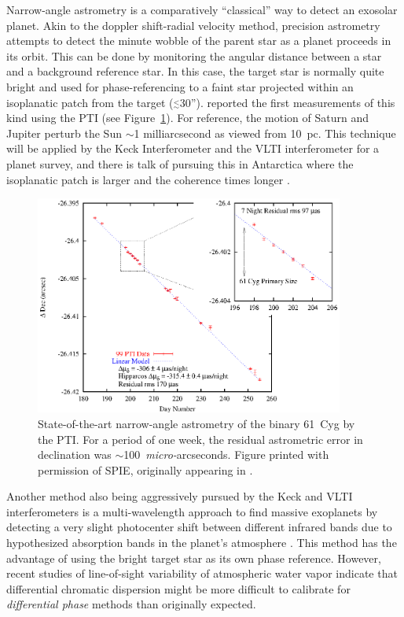 \documentclass[12pt]{article}
\newcommand{\simle}{\mbox{$\stackrel{<}{_{\sim}}$}}
\begin{document}
Narrow-angle astrometry is a comparatively ``classical'' way to detect
an exosolar planet. Akin to the doppler shift-radial velocity method,
precision astrometry attempts to detect the minute wobble of the
parent star as a planet proceeds in its orbit.  This can be done by
monitoring the angular distance between a star and a background
reference star.  In this case, the target star is normally quite
bright and used for phase-referencing to a faint star projected within
an isoplanatic patch from the target ($\simle$30'').
\citet{lane2000a} reported the first measurements of this kind using
the PTI (see
Figure~\ref{ptifig}).  For reference, the motion of Saturn and Jupiter
perturb the Sun $\sim$1 milliarcsecond as viewed from 10~pc.  This
technique will be applied by the Keck Interferometer and the VLTI
interferometer for a planet survey, and there is talk of pursuing this
in Antarctica where the isoplanatic patch is larger and the coherence
times longer \citep[e.g.,][]{lloyd2002,swain2002}.

\begin{figure}
\begin{center}
\includegraphics[clip,width=4in]{Figures/JDM_ptifig.eps}
\caption
{State-of-the-art narrow-angle astrometry of the binary
61~Cyg by the PTI. For a period of one week,
the residual astrometric error in declination was 
$\sim$100~{\em micro-}arcseconds. Figure printed with permission
of SPIE, originally appearing in \citet{lane2000a}.
\label{ptifig}}
\end{center}
\end{figure}

Another method also being aggressively pursued by the Keck and VLTI
interferometers is a multi-wavelength approach to find massive
exoplanets by detecting a very slight photocenter shift between
different infrared bands due to hypothesized absorption bands in the
planet's atmosphere \citep[i.e., the {\em differential phase} method;
e.g.,][]{as1999, lopez2000}.  This method has the advantage of using
the bright target star as its own phase reference.  However, recent
studies of line-of-sight variability of atmospheric water vapor
\citep{akeson2000b} indicate that differential chromatic dispersion
might be more difficult to calibrate for {\em differential phase}
methods than originally expected.
\end{document}
